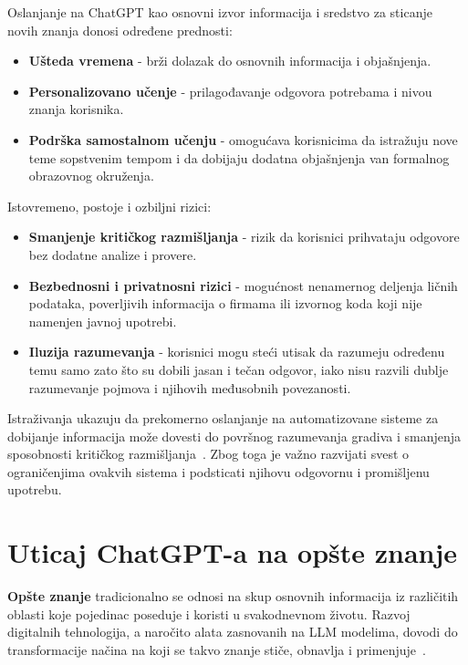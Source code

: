 \documentclass[a4paper, 12pt]{article}
\begin{document}
Oslanjanje na ChatGPT kao osnovni izvor informacija i sredstvo za sticanje novih znanja donosi određene prednosti: 
\begin{itemize}
    \item \textbf{Ušteda vremena} - brži dolazak do osnovnih informacija i objašnjenja.
    \item \textbf{Personalizovano učenje} - prilagođavanje odgovora potrebama i nivou
    znanja korisnika.
    \item \textbf{Podrška samostalnom učenju} - omogućava korisnicima da istražuju nove teme sopstvenim tempom i da dobijaju dodatna objašnjenja van formalnog obrazovnog okruženja.
\end{itemize}

Istovremeno, postoje i ozbiljni rizici:
\begin{itemize}
    \item \textbf{Smanjenje kritičkog razmišljanja} - rizik da korisnici prihvataju odgovore bez dodatne analize i provere.
    \item \textbf{Bezbednosni i privatnosni rizici} - mogućnost nenamernog deljenja ličnih podataka, poverljivih informacija o firmama ili izvornog koda koji nije namenjen javnoj upotrebi.
    \item \textbf{Iluzija razumevanja} - korisnici mogu steći utisak da razumeju određenu temu samo zato što su dobili jasan i tečan odgovor, iako nisu razvili dublje razumevanje pojmova i njihovih međusobnih povezanosti.

\end{itemize}
Istraživanja ukazuju da prekomerno oslanjanje na automatizovane sisteme za dobijanje informacija može dovesti do površnog razumevanja gradiva i smanjenja sposobnosti kritičkog razmišljanja~\cite{bommasani2021}. Zbog toga je važno razvijati svest o ograničenjima ovakvih sistema i podsticati njihovu odgovornu i promišljenu upotrebu.

\section{Uticaj ChatGPT-a na opšte znanje}

\textbf{Opšte znanje} tradicionalno se odnosi na skup osnovnih informacija iz različitih oblasti koje pojedinac poseduje i koristi u svakodnevnom životu. Razvoj digitalnih tehnologija, a naročito alata zasnovanih na LLM modelima, dovodi do transformacije načina na koji se takvo znanje stiče, obnavlja i primenjuje~\cite{bommasani2021,bender2021}.
\end{document}
